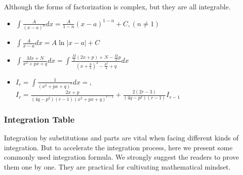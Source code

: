 Although the forms of factorization is complex, but they are all integrable.

\begin{itemize}
    \item $\int \frac{A}{(x-a)^n} dx = \frac{A}{1-n} (x-a)^{1-n} +C,(n \neq 1)$
    \item $\int \frac{A}{x-a} dx = A \ln|x-a| + C$
    \item $\int \frac{Mx+N}{x^2 + px + q} dx = \int \frac{\frac{M}{2} (2x+p) + N - \frac{M}{2} p}{(x+\frac{p}{x})^2 - \frac{p^2}{4} + q} dx$
    \item $I_r = \int \frac{1}{(x^2 + px + q)^r} dx = $, $I_r = \frac{2x + p}{(4q - p^2)(r-1)(x^2 + px + q)^{r-1}} + \frac{2(2r-3)}{(4q - p^2)(r-1)} I_{r-1}$
\end{itemize}



\subsubsection{Integration Table}

Integration by substitutions and parts are vital when facing different kinds of integration. But to accelerate the integration process, here we present some commonly used integration formula. We strongly suggest the readers to prove them one by one. They are practical for cultivating mathematical mindset.

